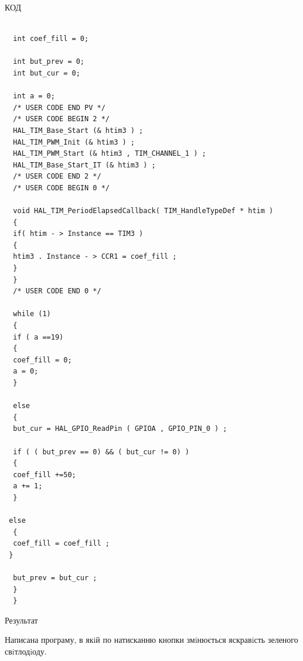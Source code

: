 \documentclass[a4paper,14pt]{extreport}
\begin{document}
\begin{center}
\begin{figure}
\end{figure}
\end{center}

\begin{center}
КОД
\end{center}

\begin{verbatim}  
 
  int coef_fill = 0;  
 
  int but_prev = 0;
  int but_cur = 0;
 
  int a = 0;  
  /* USER CODE END PV */
  /* USER CODE BEGIN 2 */
  HAL_TIM_Base_Start (& htim3 ) ;  
  HAL_TIM_PWM_Init (& htim3 ) ;  
  HAL_TIM_PWM_Start (& htim3 , TIM_CHANNEL_1 ) ;
  HAL_TIM_Base_Start_IT (& htim3 ) ;  
  /* USER CODE END 2 */
  /* USER CODE BEGIN 0 */

  void HAL_TIM_PeriodElapsedCallback( TIM_HandleTypeDef * htim )
  {
  if( htim - > Instance == TIM3 ) 
  {
  htim3 . Instance - > CCR1 = coef_fill ; 
  }
  }
  /* USER CODE END 0 */
  
  while (1)
  {
  if ( a ==19)
  {
  coef_fill = 0;
  a = 0;
  }
 
  else
  {
  but_cur = HAL_GPIO_ReadPin ( GPIOA , GPIO_PIN_0 ) ;
 
  if ( ( but_prev == 0) && ( but_cur != 0) )
  {
  coef_fill +=50;
  a += 1;
  }
 
 else
  {
  coef_fill = coef_fill ;
 }
 
  but_prev = but_cur ;
  }
  }

\end{verbatim}



\begin{center}
Результат
\end{center}

Написана програму, в якiй по натисканню кнопки змiнюється яскравiсть зеленого свiтлодiоду.
\end{document}
